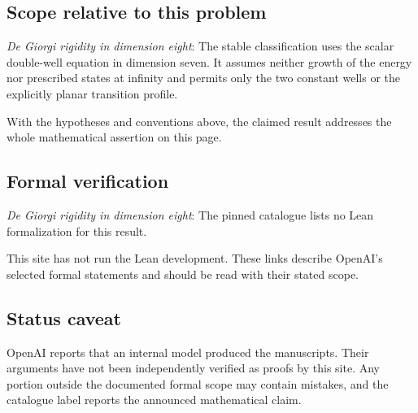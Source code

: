 \documentclass[11pt]{article}
\begin{document}
\subsection{Scope relative to this problem}
\textit{De Giorgi rigidity in dimension eight}: The stable classification uses the scalar double-well equation in dimension seven. It assumes neither growth of the energy nor prescribed states at infinity and permits only the two constant wells or the explicitly planar transition profile.

With the hypotheses and conventions above, the claimed result addresses the whole mathematical assertion on this page.

\subsection{Formal verification}
\textit{De Giorgi rigidity in dimension eight}: The pinned catalogue lists no Lean formalization for this result.

This site has not run the Lean development. These links describe OpenAI’s selected formal statements and should be read with their stated scope.

\subsection{Status caveat}
OpenAI reports that an internal model produced the manuscripts. Their arguments have not been independently verified as proofs by this site. Any portion outside the documented formal scope may contain mistakes, and the catalogue label reports the announced mathematical claim.
\end{document}
